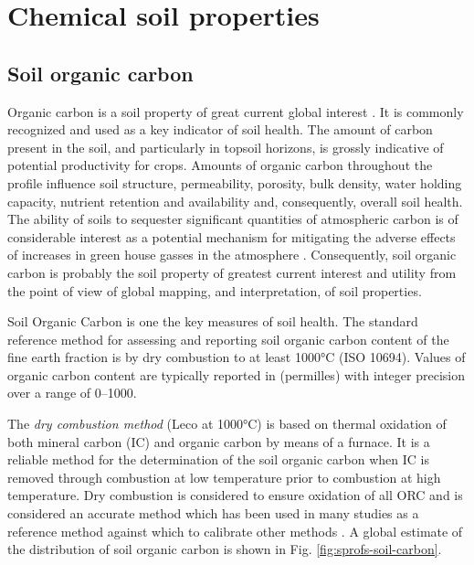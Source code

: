\documentclass[graybox,natbib,nospthms,UStrade]{svmono}
\let\BeginKnitrBlock\begin \let\EndKnitrBlock\end
\let\BeginKnitrBlock\begin \let\EndKnitrBlock\end
\begin{document}
\hypertarget{chemical-soil-properties}{%
\section{Chemical soil properties}\label{chemical-soil-properties}}

\hypertarget{soil-organic-carbon}{%
\subsection{Soil organic carbon}\label{soil-organic-carbon}}

Organic carbon is a soil property of great current global interest
\citep{Smith2004SUM, Smith2010CUP, Panagos2013439}. It is commonly
recognized and used as a key indicator of soil health. The amount of
carbon present in the soil, and particularly in topsoil horizons, is
grossly indicative of potential productivity for crops. Amounts of
organic carbon throughout the profile influence soil structure,
permeability, porosity, bulk density, water holding capacity, nutrient
retention and availability and, consequently, overall soil health. The
ability of soils to sequester significant quantities of atmospheric
carbon is of considerable interest as a potential mechanism for
mitigating the adverse effects of increases in green house gasses in the
atmosphere \citep{Smith2004SUM, Conant2010, Scharlemann2014CM}.
Consequently, soil organic carbon is probably the soil property of
greatest current interest and utility from the point of view of global
mapping, and interpretation, of soil properties.

\BeginKnitrBlock{rmdnote}
Soil Organic Carbon is one the key measures of soil health.
The standard reference method for assessing and reporting soil organic
carbon content of the fine earth fraction is by dry combustion to at
least 1000°C (ISO 10694). Values of organic carbon content are typically reported in
(permilles) with integer precision over a range of 0--1000.
\EndKnitrBlock{rmdnote}

The \emph{dry combustion method} (Leco at 1000°C) is based on thermal oxidation of
both mineral carbon (IC) and organic carbon by means of a furnace.
It is a reliable method for the determination of the soil organic carbon when IC is
removed through combustion at low temperature prior to combustion at
high temperature. Dry combustion is considered to ensure oxidation of
all ORC and is considered an accurate method which has been used in many
studies as a reference method against which to calibrate other methods
\citep{Grewal1991JSS, Meersmans2009SUM, Bisutti2004TAC}. A global estimate
of the distribution of soil organic carbon is shown in
Fig. \ref{fig:sprofs-soil-carbon}.
\end{document}
